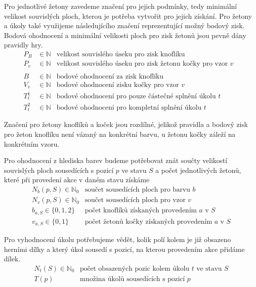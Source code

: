 Pro jednotlivé žetony zavedeme značení pro jejich podmínky, tedy minimální velikost souvislých ploch, kterou je potřeba vytvořit pro jejich získání. Pro žetony a úkoly také využijeme následujícího značení reprezentující možný bodový zisk. Bodová ohodnocení a minimální velikosti ploch pro zisk žetonů jsou pevně dány pravidly hry.
\begin{align*}
    P_B&\in\mathbb{N}                                 &\text{velikost souvislého úseku pro zisk knoflíku} \\
    P_v&\in\mathbb{N}                                 &\text{velikost souvislého úseku pro zisk žetonu kočky pro vzor $v$}\\
    &&\\
    B &\in \mathbb{N}                       &\text{bodové ohodnocení za zisk knoflíku}\\
    V_v &\in \mathbb{N}                     &\text{bodové ohodnocení zisku kočky pro vzor } v\\
    T^1_t &\in \mathbb{N}            &\text{bodové ohodnocení pro pouze částečné splnění úkolu $t$}\\
    T^2_t &\in \mathbb{N}            &\text{bodové ohodnocení pro kompletní splnění úkolu $t$}
\end{align*}

Značení pro žetony knoflíků a koček jsou rozdílné, jelikož pravidla a bodový zisk pro žeton knoflíku není vázaný na konkrétní barvu, u žetonu kočky záleží na konkrétním vzoru.

Pro ohodnocení z hlediska barev budeme potřebovat znát součty velikostí souvislých ploch sousedících s pozicí $p$ ve stavu $S$ a počet jednotlivých žetonů, které při provedení akce v daném stavu získáme
\begin{align*}
    &N_b(p,S)\in\mathbb{N}_0               &\text{součet sousedících ploch pro barvu $b$}\\
    &N_v(p,S)\in\mathbb{N}_0               &\text{součet sousedících ploch pro vzor $v$}\\ 
    &b_{a, S} \in \{0,1,2\}             &\text{počet knoflíků získaných provedením $a$ v $S$}\\
    &v_{a, S} \in \{0,1\}               &\text{počet žetonů kočky získaných provedením $a$ v $S$}
\end{align*}

Pro vyhodnocení úkolu potřebujeme vědět, kolik polí kolem je již obsazeno herními dílky a který úkol sousedí s pozicí, na kterou provedením akce přidáme dílek.
\begin{align*}
    &N_t(S)\in\mathbb{N}_0 &\text{počet obsazených pozic kolem úkolu $t$ ve stavu $S$}\\
    &T(p) &\text{množina úkolů sousedících s pozicí $p$}
\end{align*}

